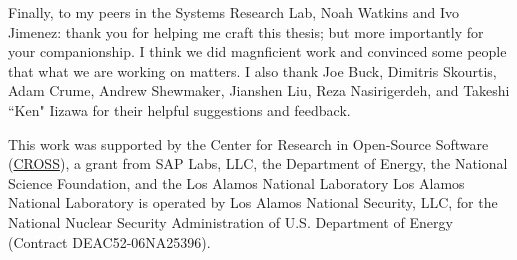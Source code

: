 \begin{frontmatter}
\begin{acknowledgements}
Finally, to my peers in the Systems Research Lab, Noah Watkins and Ivo Jimenez:
thank you for helping me craft this thesis; but more importantly for your
companionship. I think we did magnficient work and convinced some people that
what we are working on matters.  I also thank Joe Buck, Dimitris Skourtis, Adam
Crume, Andrew Shewmaker, Jianshen Liu, Reza Nasirigerdeh, and Takeshi ``Ken"
Iizawa for their helpful suggestions and feedback.

This work was supported by the Center for Research in Open-Source Software
(\href{www.cross.soe.ucsc.edu}{CROSS}), a grant from SAP Labs, LLC, the
Department of Energy, the National Science Foundation, and the Los Alamos
National Laboratory Los Alamos National Laboratory is operated by Los Alamos
National Security, LLC, for the National Nuclear Security Administration of
U.S. Department of Energy (Contract DEAC52-06NA25396).

	\end{acknowledgements}
\end{frontmatter}
